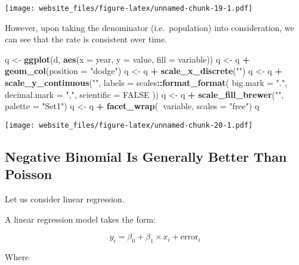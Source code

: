 \documentclass[]{book}
\newenvironment{Shaded}{\begin{snugshade}}{\end{snugshade}}
\newcommand{\KeywordTok}[1]{\textcolor[rgb]{0.13,0.29,0.53}{\textbf{#1}}}
\newcommand{\DataTypeTok}[1]{\textcolor[rgb]{0.13,0.29,0.53}{#1}}
\newcommand{\StringTok}[1]{\textcolor[rgb]{0.31,0.60,0.02}{#1}}
\newcommand{\OtherTok}[1]{\textcolor[rgb]{0.56,0.35,0.01}{#1}}
\newcommand{\OperatorTok}[1]{\textcolor[rgb]{0.81,0.36,0.00}{\textbf{#1}}}
\newcommand{\NormalTok}[1]{#1}
\begin{document}
\texttt{[image: website\_files/figure-latex/unnamed-chunk-19-1.pdf]}

However, upon taking the denominator (i.e.~population) into
consideration, we can see that the rate is consistent over time.

\begin{Shaded}
\begin{Highlighting}[]
\NormalTok{q <-}\StringTok{ }\KeywordTok{ggplot}\NormalTok{(d, }\KeywordTok{aes}\NormalTok{(}\DataTypeTok{x =}\NormalTok{ year, }\DataTypeTok{y =}\NormalTok{ value, }\DataTypeTok{fill =}\NormalTok{ variable))}
\NormalTok{q <-}\StringTok{ }\NormalTok{q }\OperatorTok{+}\StringTok{ }\KeywordTok{geom_col}\NormalTok{(}\DataTypeTok{position =} \StringTok{"dodge"}\NormalTok{)}
\NormalTok{q <-}\StringTok{ }\NormalTok{q }\OperatorTok{+}\StringTok{ }\KeywordTok{scale_x_discrete}\NormalTok{(}\StringTok{""}\NormalTok{)}
\NormalTok{q <-}\StringTok{ }\NormalTok{q }\OperatorTok{+}\StringTok{ }\KeywordTok{scale_y_continuous}\NormalTok{(}\StringTok{""}\NormalTok{, }\DataTypeTok{labels =}\NormalTok{ scales}\OperatorTok{::}\KeywordTok{format_format}\NormalTok{(}
  \DataTypeTok{big.mark =} \StringTok{"."}\NormalTok{,}
  \DataTypeTok{decimal.mark =} \StringTok{","}\NormalTok{,}
  \DataTypeTok{scientific =} \OtherTok{FALSE}
\NormalTok{))}
\NormalTok{q <-}\StringTok{ }\NormalTok{q }\OperatorTok{+}\StringTok{ }\KeywordTok{scale_fill_brewer}\NormalTok{(}\StringTok{""}\NormalTok{, }\DataTypeTok{palette =} \StringTok{"Set1"}\NormalTok{)}
\NormalTok{q <-}\StringTok{ }\NormalTok{q }\OperatorTok{+}\StringTok{ }\KeywordTok{facet_wrap}\NormalTok{(}\OperatorTok{~}\NormalTok{variable, }\DataTypeTok{scales =} \StringTok{"free"}\NormalTok{)}
\NormalTok{q}
\end{Highlighting}
\end{Shaded}

\texttt{[image: website\_files/figure-latex/unnamed-chunk-20-1.pdf]}

\subsection{Negative Binomial Is Generally Better Than
Poisson}\label{negative-binomial-is-generally-better-than-poisson}

Let us consider linear regression.

A linear regression model takes the form:

\[
y_i = \beta_0 + \beta_1 \times x_i + \text{error}_i
\]

Where
\end{document}
